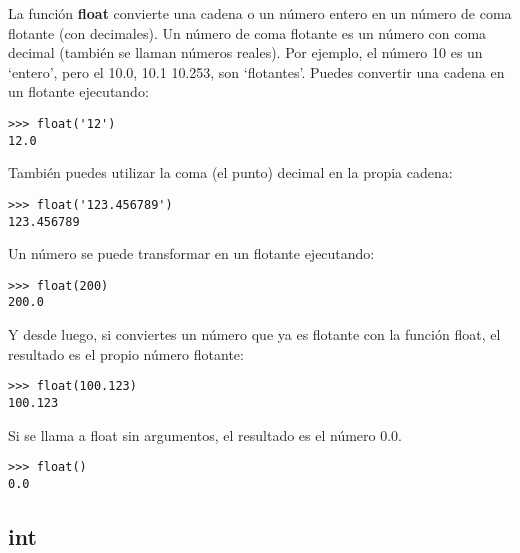 La función \textbf{float} convierte una cadena o un número entero en un número de coma flotante (con decimales).   Un número de coma flotante es un número con coma decimal (también se llaman números reales).   Por ejemplo, el número 10 es un `entero', pero el 10.0, 10.1 10.253, son `flotantes'. Puedes convertir una cadena en un flotante ejecutando:

\begin{listing}
\begin{verbatim}
>>> float('12')
12.0
\end{verbatim}
\end{listing}

\noindent
También puedes utilizar la coma (el punto) decimal en la propia cadena:

\begin{listing}
\begin{verbatim}
>>> float('123.456789')
123.456789
\end{verbatim}
\end{listing}

\noindent
Un número se puede transformar en un flotante ejecutando:

\begin{listing}
\begin{verbatim}
>>> float(200)
200.0
\end{verbatim}
\end{listing}

\noindent
Y desde luego, si conviertes un número que ya es flotante con la función float, el resultado es el propio número flotante:

\begin{listing}
\begin{verbatim}
>>> float(100.123)
100.123
\end{verbatim}
\end{listing}

\noindent
Si se llama a float sin argumentos, el resultado es el número 0.0.

\begin{listing}
\begin{verbatim}
>>> float()
0.0
\end{verbatim}
\end{listing}

\noindent

\subsection*{int}

